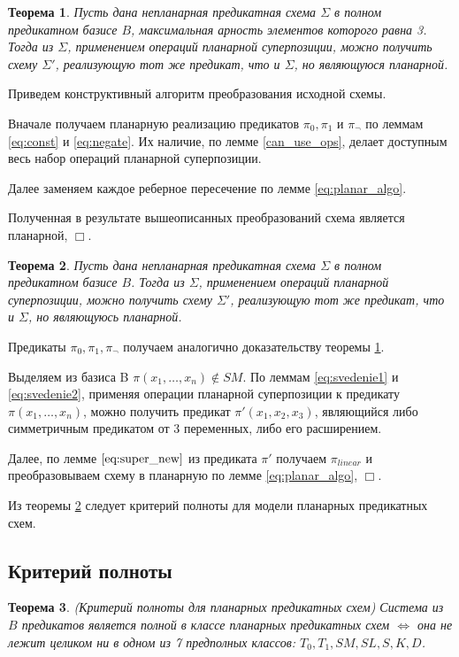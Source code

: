 \documentclass[12pt]{extarticle}
\newtheorem{theorem}{Теорема}[section]
\newenvironment{proof}[1][Доказательство.]{\begin{trivlist}
\item[\hskip \labelsep {\bfseries #1}]}{\end{trivlist}}
\begin{document}
\begin{theorem}
\label{Theo1}
Пусть дана непланарная предикатная схема $\Sigma$ в полном предикатном базисе $B$, максимальная
арность элементов которого равна 3.
Тогда из $\Sigma$, применением операций планарной суперпозиции, можно получить схему $\Sigma'$,
реализующую тот же предикат, что и $\Sigma$, но являющуюся планарной.
\end{theorem}
\begin{proof}
Приведем конструктивный алгоритм преобразования исходной схемы.

Вначале получаем планарную реализацию предикатов $\pi_0, \pi_1$ и $\pi_{\neg}$ 
по леммам \ref{eq:const} и \ref{eq:negate}. Их наличие, по лемме \ref{can_use_ops},
делает доступным весь набор операций планарной суперпозиции. 

Далее заменяем каждое реберное пересечение по лемме \ref{eq:planar_algo}. 

Полученная в результате вышеописанных преобразований схема является планарной, $\Box$.
\end{proof}

\begin{theorem}
\label{Theo2}
Пусть дана непланарная предикатная схема $\Sigma$ в полном предикатном базисе $B$. 
Тогда из $\Sigma$, применением операций планарной суперпозиции, можно получить схему $\Sigma'$,
реализующую тот же предикат, что и $\Sigma$, но являющуюсь планарной.
\end{theorem}

\begin{proof}
Предикаты $\pi_0, \pi_1, \pi_{\neg}$ получаем аналогично доказательству теоремы \ref{Theo1}.

Выделяем из базиса B $\pi(x_1, \dots, x_n) \notin SM$. По леммам \ref{eq:svedenie1} и \ref{eq:svedenie2}, 
применяя операции планарной суперпозиции к предикату $\pi(x_1, \dots, x_n)$, можно получить 
предикат $\pi'(x_1, x_2, x_3)$, являющийся либо симметричным предикатом от 3 переменных, либо его расширением. 

Далее, по лемме $\ref{eq:super_new}$ из предиката $\pi'$ получаем $\pi_{linear}$ и преобразовываем схему в планарную
по лемме \ref{eq:planar_algo}, $\Box$.
\end{proof}

Из теоремы \ref{Theo2} следует критерий полноты для модели планарных предикатных схем.

\subsection{Критерий полноты}
\begin{theorem}
(Критерий полноты для планарных предикатных схем)
Система из $B$ предикатов является полной в классе планарных предикатных схем $\iff$
она не лежит целиком ни в одном из 7 предполных классов: $T_0, T_1, SM, SL, S, K, D$. 
\end{theorem}
\end{document}
